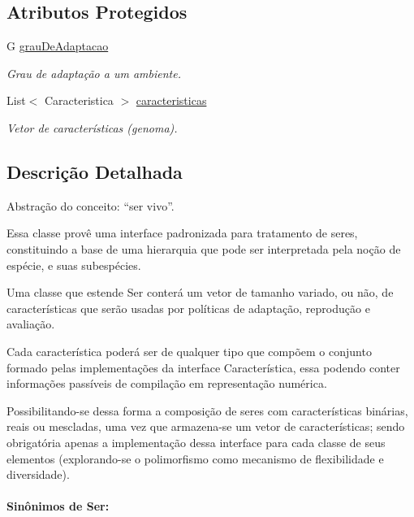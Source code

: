 \subsection*{Atributos Protegidos}
\begin{DoxyCompactItemize}
\item 
G \hyperlink{classic_1_1populacional_1_1_ser_3_01_g_01extends_01_number_01_6_comparable_3_01_g_01_4_01_4_ae66080e68d6274384056823b7868be0f}{grau\-De\-Adaptacao}
\begin{DoxyCompactList}\small\item\em Grau de adaptação a um ambiente. \end{DoxyCompactList}\item 
List$<$ Caracteristica $>$ \hyperlink{classic_1_1populacional_1_1_ser_3_01_g_01extends_01_number_01_6_comparable_3_01_g_01_4_01_4_af3bf3cd92507f965583db83b92f010ef}{caracteristicas}
\begin{DoxyCompactList}\small\item\em Vetor de características (genoma). \end{DoxyCompactList}\end{DoxyCompactItemize}


\subsection{Descrição Detalhada}
Abstração do conceito\-: “ser vivo”. 

Essa classe provê uma interface padronizada para tratamento de seres, constituindo a base de uma hierarquia que pode ser interpretada pela noção de espécie, e suas subespécies. 

Uma classe que estende {\ttfamily Ser} conterá um vetor de tamanho variado, ou não, de características que serão usadas por políticas de adaptação, reprodução e avaliação. 

Cada característica poderá ser de qualquer tipo que compõem o conjunto formado pelas implementações da interface {\ttfamily Característica}, essa podendo conter informações passíveis de compilação em representação numérica. 

Possibilitando-\/se dessa forma a composição de seres com características binárias, reais ou mescladas, uma vez que armazena-\/se um vetor de características; sendo obrigatória apenas a implementação dessa interface para cada classe de seus elementos (explorando-\/se o polimorfismo como mecanismo de flexibilidade e diversidade). 

\paragraph*{Sinônimos de Ser\-: }


